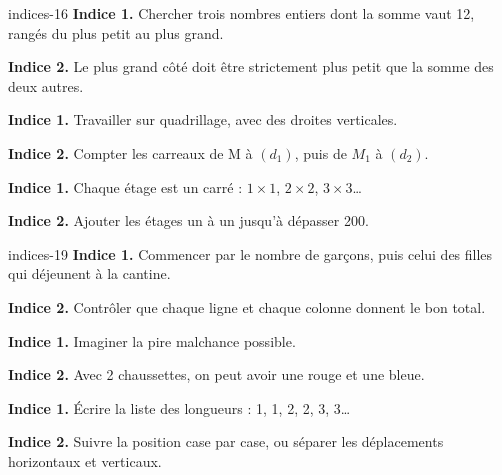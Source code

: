 \begin{blocEdition}{indices-16}
\textbf{Indice 1.} Chercher trois nombres entiers dont la somme vaut 12, rangés du plus petit au plus grand.\par\medskip\textbf{Indice 2.} Le plus grand côté doit être strictement plus petit que la somme des deux autres.\par
{}\textbf{Indice 1.} Travailler sur quadrillage, avec des droites verticales.\par\medskip\textbf{Indice 2.} Compter les carreaux de M à $(d_1)$, puis de $M_1$ à $(d_2)$.\par
{}\textbf{Indice 1.} Chaque étage est un carré : $1\times1$, $2\times2$, $3\times3$…\par\medskip\textbf{Indice 2.} Ajouter les étages un à un jusqu’à dépasser 200.\par

\end{blocEdition}
\begin{blocEdition}{indices-19}
\textbf{Indice 1.} Commencer par le nombre de garçons, puis celui des filles qui déjeunent à la cantine.\par\medskip\textbf{Indice 2.} Contrôler que chaque ligne et chaque colonne donnent le bon total.\par
{}\textbf{Indice 1.} Imaginer la pire malchance possible.\par\medskip\textbf{Indice 2.} Avec 2 chaussettes, on peut avoir une rouge et une bleue.\par
{}\textbf{Indice 1.} Écrire la liste des longueurs : 1, 1, 2, 2, 3, 3…\par\medskip\textbf{Indice 2.} Suivre la position case par case, ou séparer les déplacements horizontaux et verticaux.\par

\end{blocEdition}
